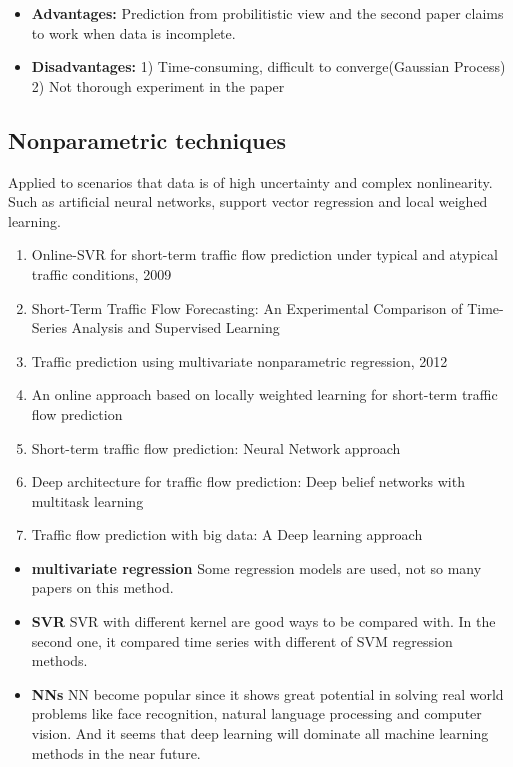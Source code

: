 \documentclass[11pt]{article}
\begin{document}
\begin{itemize}
	\item \textbf{Advantages:} Prediction from probilitistic view and the second paper claims to work when data is incomplete.
	
	\item \textbf{Disadvantages:} 1) Time-consuming, difficult to converge(Gaussian Process) 2) Not thorough experiment in the paper
\end{itemize}

\subsection{Nonparametric techniques} 
Applied to scenarios that data is of high uncertainty and complex nonlinearity. Such as artificial neural networks, support vector regression and local weighed learning.

\begin{enumerate}
	\item Online-SVR for short-term traffic flow prediction under typical and atypical traffic conditions, 2009
	\item Short-Term Traffic Flow Forecasting: An
	Experimental Comparison of Time-Series
	Analysis and Supervised Learning
	\item Traffic prediction using multivariate nonparametric regression, 2012
	\item An online approach based on locally weighted learning for short-term traffic flow prediction
	\item Short-term traffic flow prediction: Neural Network approach
	\item Deep architecture for traffic flow prediction: Deep belief networks with multitask learning
	\item Traffic flow prediction with big data: A Deep learning approach
\end{enumerate}

\begin{itemize}
	\item \textbf{multivariate regression} Some regression models are used, not so many papers on this method.
	\item \textbf{SVR } SVR with different kernel are good ways to be compared with. In the second one, it compared time series with different of SVM regression methods. 
	\item \textbf{NNs} NN become popular since it shows great potential in solving real world problems like face recognition, natural language processing and computer vision. And it seems that deep learning will dominate all machine learning methods in the near future.
\end{itemize}
\end{document}
